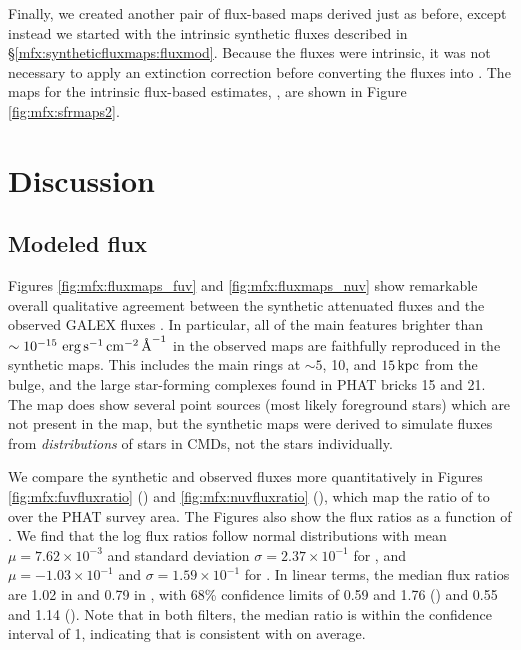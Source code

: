 \documentclass[iop, tighten]{emulateapj}
\begin{document}
Finally, we created another pair of flux-based \sfr{} maps derived just as
before, except instead we started with the intrinsic synthetic fluxes \fxsfhz{}
described in \S \ref{mfx:syntheticfluxmaps:fluxmod}. Because the fluxes were
intrinsic, it was not necessary to apply an extinction correction before
converting the fluxes into . The maps for the intrinsic flux-based
\sfr{} estimates, \sfrxz{}, are shown in Figure \ref{fig:mfx:sfrmaps2}.




\section{Discussion}\label{mfx:discussion}



\subsection{Modeled flux}\label{mfx:discussion:modflux}

Figures \ref{fig:mfx:fluxmaps_fuv} and \ref{fig:mfx:fluxmaps_nuv} show
remarkable overall qualitative agreement between the synthetic attenuated
fluxes \fxsfh{} and the observed GALEX fluxes \fxobs{}. In particular, all of
the main features brighter than $\sim 10^{-15}\, \,\mathrm{erg}\,\mathrm{s}^{-1}\,\mathrm{cm}^{-2}\,\textrm{\AA}^{-1}$ in the observed maps
are faithfully reproduced in the synthetic maps. This includes the main rings
at $\sim 5$, 10, and $15\,\mathrm{kpc}$ from the bulge, and the large star-forming
complexes found in PHAT bricks 15 and 21. The \fnuvobs{} map does show several
point sources (most likely foreground stars) which are not present in the
\fnuvsfh{} map, but the synthetic maps were derived to simulate fluxes from
\emph{distributions} of stars in CMDs, not the stars individually.

We compare the synthetic and observed fluxes more quantitatively in Figures
\ref{fig:mfx:fuvfluxratio} (\fuv{}) and \ref{fig:mfx:nuvfluxratio} (\nuv{}),
which map the ratio of \fxsfh{} to \fxobs{} over the PHAT survey area. The
Figures also show the flux ratios as a function of \fxobs{}. We find that the
log flux ratios follow normal distributions with mean $\mu = 7.62\times
10^{-3}$ and standard deviation $\sigma = 2.37\times 10^{-1}$ for \fuv{}, and
$\mu = -1.03\times 10^{-1}$ and $\sigma = 1.59\times 10^{-1}$ for \nuv{}. In
linear terms, the median flux ratios are 1.02 in \fuv{} and 0.79 in \nuv{},
with 68\% confidence limits of 0.59 and 1.76 (\fuv{}) and 0.55 and 1.14
(\nuv{}). Note that in both filters, the median ratio is within the confidence
interval of 1, indicating that \fxsfh{} is consistent with \fxobs{} on average.
\end{document}
